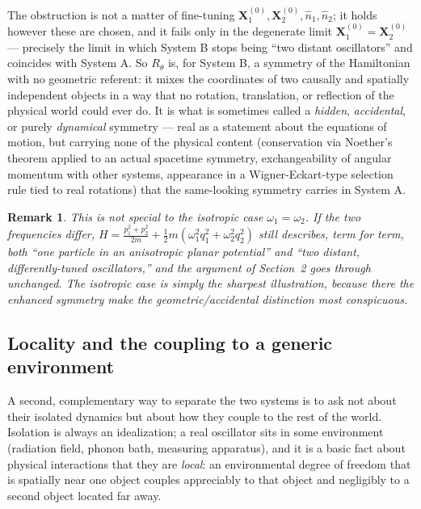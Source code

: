 \documentclass[11pt]{article}
\newtheorem{remark}{Remark}
\begin{document}
The obstruction is not a matter of fine-tuning $\mathbf{X}_1^{(0)},\mathbf{X}_2^{(0)},\hat n_1,\hat n_2$; it holds however these are chosen, and it fails only in the degenerate limit $\mathbf{X}_1^{(0)}=\mathbf{X}_2^{(0)}$ --- precisely the limit in which System B stops being ``two distant oscillators'' and coincides with System A. So $R_\theta$ is, for System B, a symmetry of the Hamiltonian with no geometric referent: it mixes the coordinates of two causally and spatially independent objects in a way that no rotation, translation, or reflection of the physical world could ever do. It is what is sometimes called a \emph{hidden}, \emph{accidental}, or purely \emph{dynamical} symmetry --- real as a statement about the equations of motion, but carrying none of the physical content (conservation via Noether's theorem applied to an actual spacetime symmetry, exchangeability of angular momentum with other systems, appearance in a Wigner-Eckart-type selection rule tied to real rotations) that the same-looking symmetry carries in System A.

\begin{remark}
This is not special to the isotropic case $\omega_1=\omega_2$. If the two frequencies differ, $H=\frac{p_1^2+p_2^2}{2m}+\frac12 m(\omega_1^2q_1^2+\omega_2^2q_2^2)$ still describes, term for term, both ``one particle in an anisotropic planar potential'' and ``two distant, differently-tuned oscillators,'' and the argument of Section~2 goes through unchanged. The isotropic case is simply the sharpest illustration, because there the enhanced symmetry make the geometric/accidental distinction most conspicuous.
\end{remark}

\subsection{Locality and the coupling to a generic environment}

A second, complementary way to separate the two systems is to ask not about their isolated dynamics but about how they couple to the rest of the world. Isolation is always an idealization; a real oscillator sits in some environment (radiation field, phonon bath, measuring apparatus), and it is a basic fact about physical interactions that they are \emph{local}: an environmental degree of freedom that is spatially near one object couples appreciably to that object and negligibly to a second object located far away.
\end{document}
